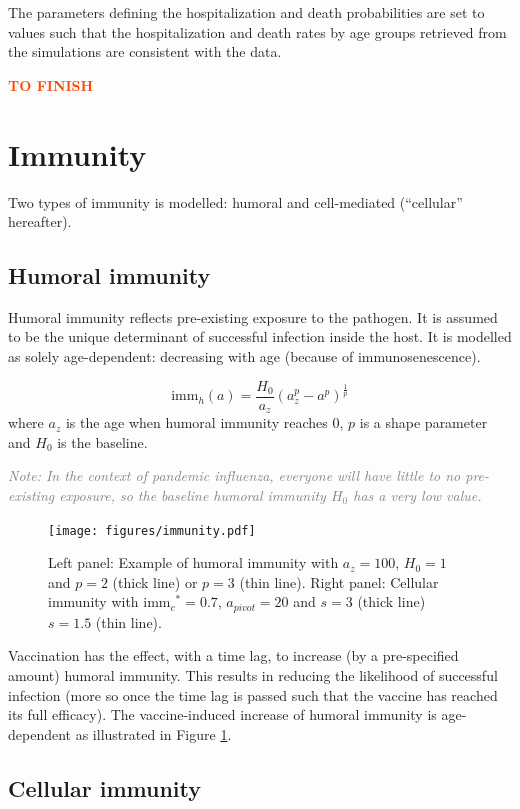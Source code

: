 \documentclass[11pt, onecolumn]{article}
\newcommand{\warning}[1]{\textbf{\textcolor{OrangeRed}{#1}}}
\newcommand{\note}[1]{\textit{\textcolor{Grey}{Note: #1}}}
\newcommand{\immh}{\ensuremath{\text{imm}_h}}
\newcommand{\immc}{\ensuremath{\text{imm}_c}}
\begin{document}
The parameters defining the hospitalization and death probabilities are set to values such that the hospitalization and death rates by age groups retrieved from the simulations are consistent with the data. 

\warning{TO FINISH}




\section{Immunity}

Two types of immunity is modelled: humoral and cell-mediated (``cellular'' hereafter). 

\subsection{Humoral immunity}	
Humoral immunity reflects pre-existing exposure to the pathogen. It is assumed to be the unique determinant of successful infection inside the host. It is modelled as solely age-dependent: decreasing with age (because of immunosenescence).

\begin{equation}
\immh (a) = \frac{H_0 }{a_z}(a_z^p - a^p) ^\frac{1}{p}
\end{equation}
where $a_z$ is the age when humoral immunity reaches 0, $p$ is a shape parameter  and $H_0$ is the baseline.

\note{In the context of pandemic influenza, everyone will have little to no pre-existing exposure, so the baseline humoral immunity $H_0$ has a very low value.}

\begin{figure}[!ht]
\centering
    \texttt{[image: figures/immunity.pdf]}
\caption{Left panel: Example of humoral immunity with $a_z=100$, $H_0=1$ and $p=2$ (thick line) or $p=3$ (thin line). Right panel: Cellular immunity with $\immc^* = 0.7$,  $a_{pivot}=20$ and $s=3$ (thick line) $s=1.5$ (thin line).}
\label{fig:immunity}
\end{figure}

Vaccination has the effect, with a time lag, to increase (by a pre-specified amount) humoral immunity. This results in reducing the likelihood of successful infection (more so once the time lag is passed such that the vaccine has reached its full efficacy). The vaccine-induced increase of humoral immunity is age-dependent as illustrated in Figure \ref{fig:immunity}. 

\subsection{Cellular immunity}	
\end{document}
